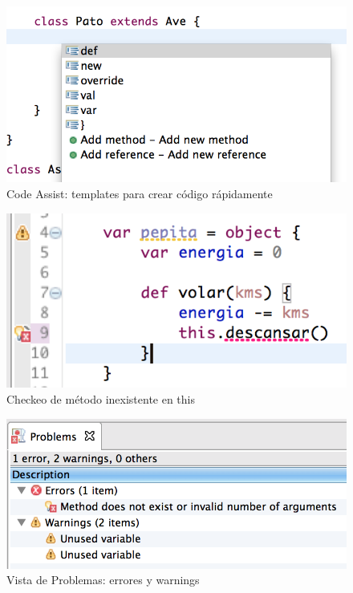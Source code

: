 \documentclass[preprint,10pt]{sigplanconf}
\begin{document}
	\begin{figure}[p]
	    \centering
		\includegraphics[scale=0.5]{images/wollok-paper-codetemplates.png}
	    \caption{Code Assist: templates para crear código rápidamente}
	    \label{fig:check-noMethodOnThis.png}
	\end{figure}

	\begin{figure}[p]
	    \centering
		\includegraphics[scale=0.5]{images/wollok-paper-check-noMethodOnThis.png}
	    \caption{Checkeo de método inexistente en this}
	    \label{fig:check-noMethodOnThis.png}
	\end{figure}

	\begin{figure}[p]
	    \centering
		\includegraphics[scale=0.5]{images/wollok-paper-check-problemsview.png}
	    \caption{Vista de Problemas: errores y warnings}
	    \label{fig:check-noMethodOnThis.png}
	\end{figure}
\end{document}
